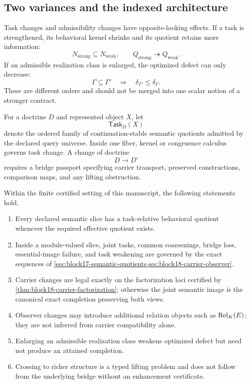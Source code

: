 \subsection{Two variances and the indexed architecture}
\label{subsec:block19-indexed-architecture}

Task changes and admissibility changes have opposite-looking effects.  If a task is strengthened, its behavioral kernel shrinks and its quotient retains more information:
\[
 N_{\mathrm{strong}}\subseteq N_{\mathrm{weak}},
 \qquad
 Q_{\mathrm{strong}}\twoheadrightarrow Q_{\mathrm{weak}}.
\]
If an admissible realization class is enlarged, the optimized defect can only decrease:
\[
 \Gamma\subseteq\Gamma'
 \quad\Longrightarrow\quad
 \delta_{\Gamma'}\leq\delta_\Gamma.
\]
These are different orders and should not be merged into one scalar notion of a stronger contract.

\begin{definition}
\label{def:block19-task-fiber}
For a doctrine \(D\) and represented object \(X\), let
\[
 \mathsf{Task}_D(X)
\]
denote the ordered family of continuation-stable semantic quotients admitted by the declared query universe.  Inside one fiber, kernel or congruence calculus governs task change.  A change of doctrine
\[
 D\longrightarrow D'
\]
requires a bridge passport specifying carrier transport, preserved constructions, comparison maps, and any lifting obstruction.
\end{definition}

\begin{theorem}
\label{thm:block19-relative-semantic-synthesis}
Within the finite certified setting of this manuscript, the following statements hold.
\begin{enumerate}
\item Every declared semantic slice has a task-relative behavioral quotient whenever the required effective quotient exists.
\item Inside a module-valued slice, joint tasks, common coarsenings, bridge loss, essential-image failure, and task weakening are governed by the exact sequences of \cref{sec:block17-semantic-quotients,sec:block18-carrier-observer}.
\item Carrier changes are legal exactly on the factorization loci certified by \cref{thm:block18-carrier-factorization}; otherwise the joint semantic image is the canonical exact completion preserving both views.
\item Observer changes may introduce additional relation objects such as \(\operatorname{Rel}_K(E)\); they are not inferred from carrier compatibility alone.
\item Enlarging an admissible realization class weakens optimized defect but need not produce an attained completion.
\item Crossing to richer structure is a typed lifting problem and does not follow from the underlying bridge without an enhancement certificate.
\end{enumerate}
\end{theorem}

